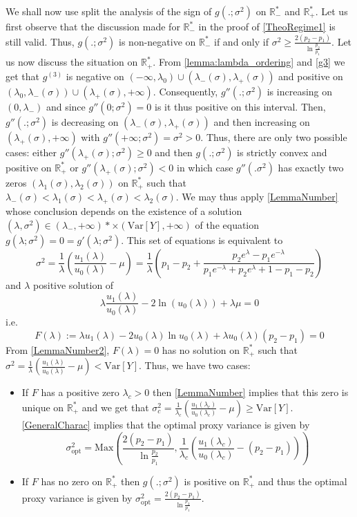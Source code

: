 \documentclass[a4paper, 10pt]{article}
\newcommand{\beq}{\begin{equation}}
\newcommand{\eeq}{\end{equation}}
\theoremstyle{definition}
\begin{document}
We shall now use split the analysis of the sign of $g(.;\sigma^2)$ on $\mathbb{R}_-^*$ and $\mathbb{R}_+^*$. Let us first observe that the discussion made for $\mathbb{R}_-^*$ in the proof of \autoref{TheoRegime1} is still valid. Thus, $g(.;\sigma^2)$ is non-negative on $\mathbb{R}_-^*$ if and only if $\sigma^2\geq \frac{2(p_2-p_1)}{\ln \frac{p_2}{p_1}}$. Let us now discuss the situation on $\mathbb{R}_+^*$. From \autoref{lemma:lambda_ordering} and \eqref{g3} we get that $g^{(3)}$ is negative on $(-\infty,\lambda_0)\cup\left(\lambda_-(\sigma),\lambda_+(\sigma)\right)$  and positive on $(\lambda_0,\lambda_-(\sigma))\cup\left(\lambda_+(\sigma),+\infty\right)$. Consequently, $g''(.;\sigma^2)$ is increasing on $(0,\lambda_-)$ and since $g''(0;\sigma^2)=0$ is it thus positive on this interval. Then, $g''(.;\sigma^2)$ is decreasing on $(\lambda_-(\sigma),\lambda_+(\sigma))$ and then increasing on $(\lambda_+(\sigma),+\infty)$ with $g''(+\infty;\sigma^2)=\sigma^2>0$. Thus, there are only two possible cases: either $g''(\lambda_+(\sigma);\sigma^2)\geq 0$ and then $g(.;\sigma^2)$ is strictly convex and positive on $\mathbb{R}_+^*$ or $g''(\lambda_+(\sigma);\sigma^2)<0$ in which case $g''(.\sigma^2)$ has exactly two zeros $(\lambda_1(\sigma),\lambda_2(\sigma))$ on $\mathbb{R}_+^*$ such that $\lambda_-(\sigma)<\lambda_1(\sigma)<\lambda_+(\sigma)<\lambda_2(\sigma)$. We may thus apply \autoref{LemmaNumber} whose conclusion depends on the existence of a solution $(\lambda,\sigma^2)\in \left(\lambda_-,+\infty\right)*\times \left(\text{Var}[Y],+\infty\right)$ of the equation $g(\lambda;\sigma^2)=0=g'(\lambda;\sigma^2)$. This set of equations is equivalent to
\beq \sigma^2=\frac{1}{\lambda}\left(\frac{u_1(\lambda)}{u_0(\lambda)}-\mu\right)=\frac{1}{\lambda}\left(p_1-p_2+\frac{p_2e^\lambda-p_1e^{-\lambda}}{p_1e^{-\lambda}+p_2e^{\lambda}+1-p_1-p_2}\right)
\eeq
and $\lambda$ positive solution of
\beq \lambda \frac{u_1(\lambda)}{u_0(\lambda)}- 2\ln (u_0(\lambda))+\lambda \mu=0\eeq
i.e.
\beq \label{EqF} F(\lambda):=\lambda u_1(\lambda)-2u_0(\lambda)\ln u_0(\lambda)+ \lambda u_0(\lambda)(p_2-p_1)=0\eeq
From \autoref{LemmaNumber2}, $F(\lambda)=0$ has no solution on $\mathbb{R}_+^*$ such that $\sigma^2=\frac{1}{\lambda}\left(\frac{u_1(\lambda)}{u_0(\lambda)}-\mu\right)<\text{Var}[Y]$. Thus, we have two cases:
\begin{itemize}
    \item If $F$ has a positive zero $\lambda_c>0$ then \autoref{LemmaNumber} implies that this zero is unique on $\mathbb{R}_+^*$ and we get that $\sigma_c^2=\frac{1}{\lambda_c}\left(\frac{u_1(\lambda_c)}{u_0(\lambda_c)}-\mu\right)\geq\text{Var}[Y]$. \autoref{GeneralCharac} implies that the optimal proxy variance is given by
    \beq \sigma_{\text{opt}}^2=\text{Max}\left(\frac{2(p_2-p_1)}{\ln \frac{p_2}{p_1}}, \frac{1}{\lambda_c}\left(\frac{u_1(\lambda_c)}{u_0(\lambda_c)}-(p_2-p_1)\right) \right)\eeq
    \item If $F$ has no zero on $\mathbb{R}_+^*$ then $g(.;\sigma^2)$ is positive on $\mathbb{R}_+^*$ and thus the optimal proxy variance is given by $\sigma^2_{\text{opt}}=\frac{2(p_2-p_1)}{\ln \frac{p_2}{p_1}}$.
\end{itemize}
\end{document}
